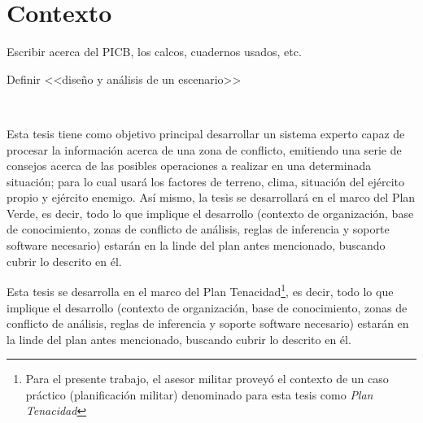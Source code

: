 \section{Contexto}

Escribir acerca del PICB, los calcos, cuadernos usados, etc.


Definir <<diseño y análisis de un escenario>>



\ \newline
{}

Esta tesis tiene como objetivo principal desarrollar un sistema experto capaz de procesar la información acerca de una zona de conflicto, emitiendo una serie de consejos acerca de las posibles operaciones a realizar en una determinada situación; para lo cual usará los factores de terreno, clima, situación del ejército propio y ejército enemigo. Así mismo, la tesis se desarrollará en el marco del Plan Verde, es decir, todo lo que implique el desarrollo (contexto de organización, base de conocimiento, zonas de conflicto de análisis, reglas de inferencia y soporte software necesario) estarán en la linde del plan antes mencionado, buscando cubrir lo descrito en él.

Esta tesis se desarrolla en el marco del Plan Tenacidad\footnote{Para el presente trabajo, el asesor militar proveyó el contexto de un caso práctico (planificación militar) denominado para esta tesis como \emph{Plan Tenacidad}}, es decir, todo lo que implique el desarrollo (contexto de organización, base de conocimiento, zonas de conflicto de análisis, reglas de inferencia y soporte software necesario) estarán en la linde del plan antes mencionado, buscando cubrir lo descrito en él.


